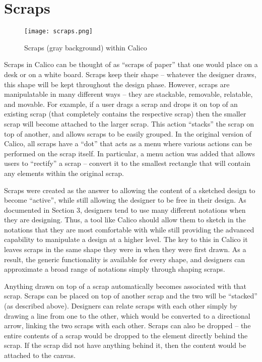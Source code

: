\section{Scraps}

\begin{figure}[htb]
  \centering
  \texttt{[image: scraps.png]}
  \caption{Scraps (gray background) within Calico}
  \label{fig:scraps}
\end{figure}

Scraps in Calico can be thought of as ``scraps of paper'' that one would place on a desk or on a white board.
Scraps keep their shape -- whatever the designer draws, this shape will be kept throughout the design phase.
However, scraps are manipulatable in many different ways -- they are stackable, removable, relatable, and movable. 
For example, if a user drags a scrap and drops it on top of an existing scrap (that completely contains the respective scrap) then the smaller scrap will become attached to the larger scrap. This action ``stacks'' the scrap on top of another, and allows scraps to be easily grouped.
In the original version of Calico, all scraps have a ``dot'' that acts as a menu where various actions can be performed on the scrap itself.
In particular, a menu action was added that allows users to ``rectify'' a scrap -- convert it to the smallest rectangle that will contain any elements within the original scrap.

Scraps were created as the answer to allowing the content of a sketched design to become ``active'', while still allowing the designer to be free in their design.
As documented in Section 3, designers tend to use many different notations when they are designing. Thus, a tool like Calico should allow them to sketch in the notations that they are most comfortable with while still providing the advanced capability to manipulate a design at a higher level.
The key to this in Calico it leaves scraps in the same shape they were in when they were first drawn. 
As a result, the generic functionality is available for every shape, and designers can approximate a broad range of notations simply through shaping scraps.

Anything drawn on top of a scrap automatically becomes associated with that scrap.
Scraps can be placed on top of another scrap and the two will be ``stacked'' (as described above).
Designers can relate scraps with each other simply by drawing a line from one to the other, which would be converted to a directional arrow, linking the two scraps with each other. Scraps can also be dropped -- the entire contents of a scrap would be dropped to the element directly behind the scrap. If the scrap did not have anything behind it, then the content would be attached to the canvas.



